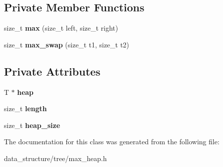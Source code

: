 \subsection*{Private Member Functions}
\begin{DoxyCompactItemize}
\item 
\mbox{\label{classMaxHeap_ab740bb4c5a3b3f922e87c9c8c7b857ef}} 
size\+\_\+t {\bfseries max} (size\+\_\+t left, size\+\_\+t right)
\item 
\mbox{\label{classMaxHeap_afbbfe6956f66887e8d135acf2bd5a899}} 
size\+\_\+t {\bfseries max\+\_\+swap} (size\+\_\+t t1, size\+\_\+t t2)
\end{DoxyCompactItemize}
\subsection*{Private Attributes}
\begin{DoxyCompactItemize}
\item 
\mbox{\label{classMaxHeap_ad07136d5762b8eaa1b698e194bfd968d}} 
T $\ast$ {\bfseries heap}
\item 
\mbox{\label{classMaxHeap_a266d58512b29a2590ae7c2124abcd8b7}} 
size\+\_\+t {\bfseries length}
\item 
\mbox{\label{classMaxHeap_a75c308a7e7406ddc74242ffbc13e55fd}} 
size\+\_\+t {\bfseries heap\+\_\+size}
\end{DoxyCompactItemize}


The documentation for this class was generated from the following file\+:\begin{DoxyCompactItemize}
\item 
data\+\_\+structure/tree/max\+\_\+heap.\+h\end{DoxyCompactItemize}
